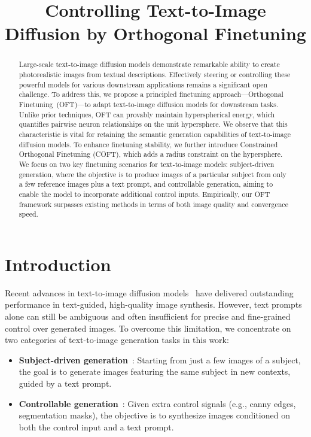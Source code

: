 \title{Controlling Text-to-Image Diffusion by Orthogonal Finetuning}

\begin{abstract}
Large-scale text-to-image diffusion models demonstrate remarkable ability to create photorealistic images from textual descriptions. Effectively steering or controlling these powerful models for various downstream applications remains a significant open challenge. To address this, we propose a principled finetuning approach—Orthogonal Finetuning~(OFT)—to adapt text-to-image diffusion models for downstream tasks. Unlike prior techniques, OFT can provably maintain hyperspherical energy, which quantifies pairwise neuron relationships on the unit hypersphere. We observe that this characteristic is vital for retaining the semantic generation capabilities of text-to-image diffusion models. To enhance finetuning stability, we further introduce Constrained Orthogonal Finetuning (COFT), which adds a radius constraint on the hypersphere. We focus on two key finetuning scenarios for text-to-image models: subject-driven generation, where the objective is to produce images of a particular subject from only a few reference images plus a text prompt, and controllable generation, aiming to enable the model to incorporate additional control inputs. Empirically, our OFT framework surpasses existing methods in terms of both image quality and convergence speed.
\end{abstract}

\section{Introduction}

Recent advances in text-to-image diffusion models~\cite{saharia2022photorealistic,ramesh2022hierarchical,rombach2022high} have delivered outstanding performance in text-guided, high-quality image synthesis. However, text prompts alone can still be ambiguous and often insufficient for precise and fine-grained control over generated images. To overcome this limitation, we concentrate on two categories of text-to-image generation tasks in this work:

\begin{itemize}[leftmargin=*,nosep]

    \item \textbf{Subject-driven generation}~\cite{ruiz2023dreambooth}: Starting from just a few images of a subject, the goal is to generate images featuring the same subject in new contexts, guided by a text prompt.
    \item \textbf{Controllable generation}~\cite{zhang2023adding,mou2023t2i}: Given extra control signals (e.g., canny edges, segmentation masks), the objective is to synthesize images conditioned on both the control input and a text prompt.
\end{itemize}

